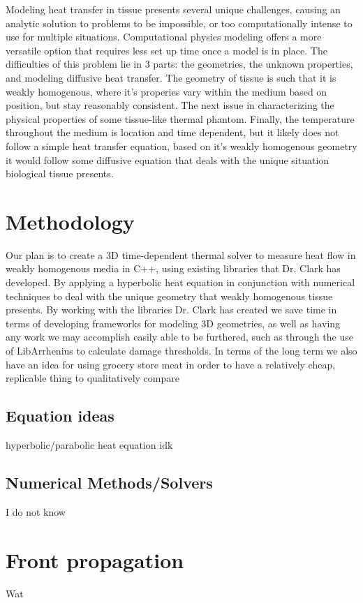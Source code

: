 \documentclass[12pt]{article}
\begin{document}
Modeling heat transfer in tissue presents several unique challenges, causing an analytic solution to problems to be impossible, or too computationally intense to use for multiple situations. Computational physics modeling offers a more versatile option that requires less set up time once a model is in place. The difficulties of this problem lie in 3 parts: the geometries, the unknown properties, and modeling diffusive heat transfer.
The geometry of tissue is such that it is weakly homogenous, where it's properies vary within the medium based on position, but stay reasonably consistent. The next issue in characterizing the physical properties of some tissue-like thermal phantom. Finally, the temperature throughout the medium is location and time dependent, but it likely does not follow a simple heat transfer equation, based on it's weakly homogenous geometry it would follow some diffusive equation that deals with the unique situation biological tissue presents.
\section{Methodology}
Our plan is to create a 3D time-dependent thermal solver to measure heat flow in weakly homogenous media in C++, using existing libraries that Dr. Clark has developed. By applying a hyperbolic heat equation in conjunction with numerical techniques to deal with the unique geometry that weakly homogenous tissue presents. By working with the libraries Dr. Clark has created we save time in terms of developing frameworks for modeling 3D geometries, as well as having any work we may accomplish easily able to be furthered, such as through the use of LibArrhenius to calculate damage thresholds. In terms of the long term we also have an idea for using grocery store meat in order to have a relatively cheap, replicable thing to qualitatively compare

\subsection{Equation ideas}
hyperbolic/parabolic heat equation
idk
\subsection{Numerical Methods/Solvers}
I do not know
\section{Front propagation}
Wat
\end{document}
